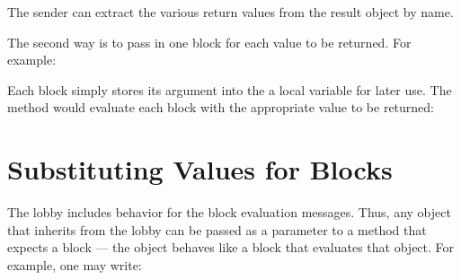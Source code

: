 \documentclass[letterpaper,10pt,english]{sphinxmanual}
\begin{document}
The sender can extract the various return values from the result object by name.

The second way is to pass in one block for each value to be returned. For example:

\begin{sphinxVerbatim}[commandchars=\\\{\}]
\PYG{p}{[}     \PYG{p}{]}
    \PYG{p}{[}     \PYG{p}{]}
    \PYG{p}{[}     \PYG{p}{]}
\end{sphinxVerbatim}

Each block simply stores its argument into the a local variable for later use. The
 method would evaluate each block with the appropriate
value to be returned:

\begin{sphinxVerbatim}[commandchars=\\\{\}]
       
      
      
      
\end{sphinxVerbatim}


\section{Substituting Values for Blocks}
\label{\detokenize{progguid:substituting-values-for-blocks}}
The lobby includes behavior for the block evaluation messages. Thus, any object that inherits from
the lobby can be passed as a parameter to a method that expects a block — the object behaves like
a block that evaluates that object. For example, one may write:

\begin{sphinxVerbatim}[commandchars=\\\{\}]
       
\end{sphinxVerbatim}
\end{document}
